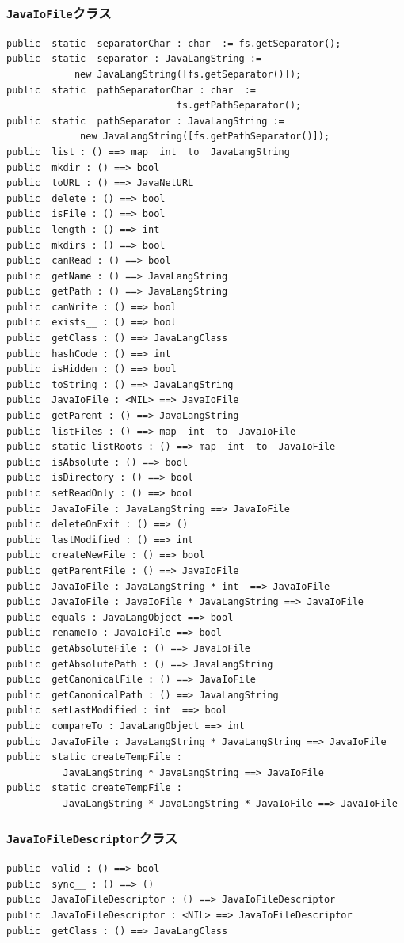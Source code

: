 \documentclass[\pformat,12pt]{jarticle}
\begin{document}
\subsubsection{\texttt{JavaIoFile}クラス}
\begin{small}
\begin{verbatim}
public  static  separatorChar : char  := fs.getSeparator();
public  static  separator : JavaLangString := 
            new JavaLangString([fs.getSeparator()]);
public  static  pathSeparatorChar : char  := 
                              fs.getPathSeparator();
public  static  pathSeparator : JavaLangString := 
             new JavaLangString([fs.getPathSeparator()]);
public  list : () ==> map  int  to  JavaLangString
public  mkdir : () ==> bool
public  toURL : () ==> JavaNetURL
public  delete : () ==> bool
public  isFile : () ==> bool
public  length : () ==> int
public  mkdirs : () ==> bool
public  canRead : () ==> bool
public  getName : () ==> JavaLangString
public  getPath : () ==> JavaLangString
public  canWrite : () ==> bool
public  exists__ : () ==> bool
public  getClass : () ==> JavaLangClass
public  hashCode : () ==> int
public  isHidden : () ==> bool
public  toString : () ==> JavaLangString
public  JavaIoFile : <NIL> ==> JavaIoFile
public  getParent : () ==> JavaLangString
public  listFiles : () ==> map  int  to  JavaIoFile
public  static listRoots : () ==> map  int  to  JavaIoFile
public  isAbsolute : () ==> bool
public  isDirectory : () ==> bool
public  setReadOnly : () ==> bool
public  JavaIoFile : JavaLangString ==> JavaIoFile
public  deleteOnExit : () ==> ()
public  lastModified : () ==> int
public  createNewFile : () ==> bool
public  getParentFile : () ==> JavaIoFile
public  JavaIoFile : JavaLangString * int  ==> JavaIoFile
public  JavaIoFile : JavaIoFile * JavaLangString ==> JavaIoFile
public  equals : JavaLangObject ==> bool
public  renameTo : JavaIoFile ==> bool
public  getAbsoluteFile : () ==> JavaIoFile
public  getAbsolutePath : () ==> JavaLangString
public  getCanonicalFile : () ==> JavaIoFile
public  getCanonicalPath : () ==> JavaLangString
public  setLastModified : int  ==> bool
public  compareTo : JavaLangObject ==> int
public  JavaIoFile : JavaLangString * JavaLangString ==> JavaIoFile
public  static createTempFile : 
          JavaLangString * JavaLangString ==> JavaIoFile
public  static createTempFile : 
          JavaLangString * JavaLangString * JavaIoFile ==> JavaIoFile
\end{verbatim}
\end{small}

\subsubsection{\texttt{JavaIoFileDescriptor}クラス}
\begin{small}
\begin{verbatim}
public  valid : () ==> bool
public  sync__ : () ==> ()
public  JavaIoFileDescriptor : () ==> JavaIoFileDescriptor
public  JavaIoFileDescriptor : <NIL> ==> JavaIoFileDescriptor
public  getClass : () ==> JavaLangClass
\end{verbatim}
\end{small}
\end{document}
